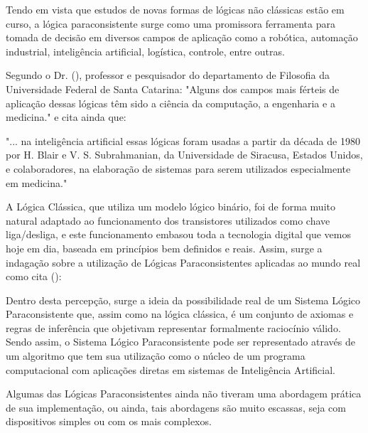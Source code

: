
Tendo em vista que estudos de novas formas de lógicas não clássicas estão em curso, a lógica paraconsistente surge como uma promissora ferramenta para tomada de decisão em diversos campos de aplicação como a robótica, automação industrial, inteligência artificial, logística, controle, entre outras\cite{JoaoInacio}.
 
Segundo o Dr. \citeauthor{DecioKrause}(\citeyear{DecioKrause}), professor e pesquisador do departamento de Filosofia da Universidade Federal de Santa Catarina: "Alguns dos campos mais férteis de aplicação dessas lógicas têm sido a ciência da computação, a engenharia e a medicina." e cita ainda que:
\begin{citacao}{
 "... na inteligência artificial essas lógicas foram usadas a partir da década de 1980 por H. Blair e V. S. Subrahmanian, da Universidade de Siracusa, Estados Unidos, e colaboradores, na elaboração de sistemas para serem utilizados especialmente em medicina." 
}
\end{citacao}

A Lógica Clássica, que utiliza um modelo lógico binário, foi de forma muito natural adaptado ao funcionamento dos transistores utilizados como chave liga/desliga, e este funcionamento embasou toda a tecnologia digital que vemos hoje em dia, baseada em princípios bem definidos e reais. Assim, surge a indagação sobre a utilização de Lógicas Paraconsistentes aplicadas ao mundo real como cita \citeauthor{JISF2011}(\citeyear{JISF2011}):

\begin{citacao}{
Dentro desta percepção, surge a ideia da possibilidade real de um Sistema Lógico Paraconsistente que, assim como na lógica clássica, é um conjunto de axiomas e regras de inferência que objetivam representar formalmente raciocínio válido. Sendo assim, o Sistema Lógico Paraconsistente pode ser representado através de um algoritmo que tem sua utilização como o núcleo de um programa computacional com aplicações diretas em sistemas de Inteligência Artificial.
}
\end{citacao}



Algumas das Lógicas Paraconsistentes ainda não tiveram  uma abordagem prática de sua implementação, ou ainda, tais abordagens são muito escassas, seja com dispositivos simples ou com os mais complexos. 

